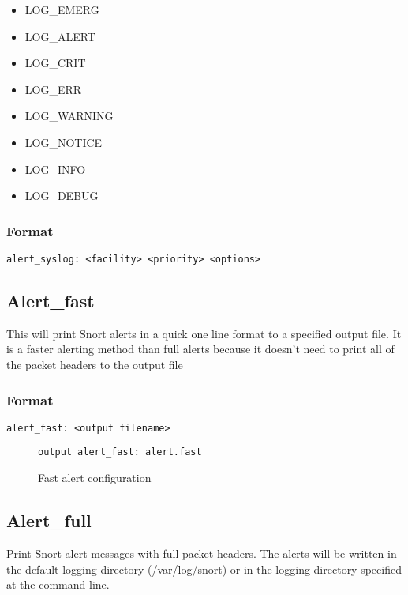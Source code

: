 \documentclass[english]{report}
\begin{document}
\begin{itemize}
\item LOG\_EMERG 
\item LOG\_ALERT 
\item LOG\_CRIT 
\item LOG\_ERR 
\item LOG\_WARNING 
\item LOG\_NOTICE 
\item LOG\_INFO 
\item LOG\_DEBUG
\end{itemize}

\subsubsection{Format}

\begin{verbatim}
alert_syslog: <facility> <priority> <options>
\end{verbatim}

\subsection{Alert\_fast}

This will print Snort alerts in a quick one line format to a specified
output file. It is a faster alerting method than full alerts because
it doesn't need to print all of the packet headers to the output file


\subsubsection{Format}

\begin{verbatim}
alert_fast: <output filename>
\end{verbatim}
%
\begin{figure}[!hbpt]
\begin{verbatim}
output alert_fast: alert.fast
\end{verbatim}

\caption{\label{fast alert configuration}Fast alert configuration}
\end{figure}



\subsection{Alert\_full}

Print Snort alert messages with full packet headers. The alerts will
be written in the default logging directory (/var/log/snort) or in
the logging directory specified at the command line.
\end{document}

